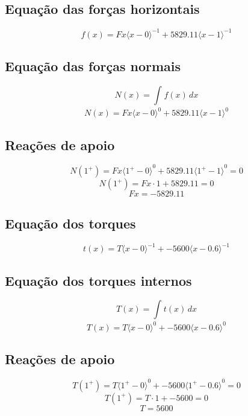 \documentclass[10pt]{article}
\begin{document}
\subsection*{Equação das forças horizontais}
\[{\scriptstyle f(x) = Fx{\langle x-0 \rangle}^{-1} + 5829.11{\langle x-1 \rangle}^{-1}
}\]\subsection*{Equação das forças normais}
\[{\scriptstyle N(x) = \int_{}^{} f(x) \,dx }\]\[{\scriptstyle N(x) = Fx{\langle x-0 \rangle}^{0} + 5829.11{\langle x-1 \rangle}^{0}
}\]\subsection*{Reações de apoio}
\[{\scriptstyle N(1^{+}) = Fx{\langle 1^{+}-0 \rangle}^{0} + 5829.11{\langle 1^{+}-1 \rangle}^{0}
 = 0}\]\[{\scriptstyle N(1^{+}) = Fx \cdot 1 + 5829.11  = 0}\]\[{\scriptstyle Fx = -5829.11 }\]
\subsection*{Equação dos torques}
\[{\scriptstyle t(x) = T{\langle x-0 \rangle}^{-1} + -5600{\langle x-0.6 \rangle}^{-1}
}\]\subsection*{Equação dos torques internos}
\[{\scriptstyle T(x) = \int_{}^{} t(x) \,dx }\]\[{\scriptstyle T(x) = T{\langle x-0 \rangle}^{0} + -5600{\langle x-0.6 \rangle}^{0}
}\]\subsection*{Reações de apoio}
\[{\scriptstyle T(1^{+}) = T{\langle 1^{+}-0 \rangle}^{0} + -5600{\langle 1^{+}-0.6 \rangle}^{0}
 = 0}\]\[{\scriptstyle T(1^{+}) = T \cdot 1 + -5600  = 0}\]\[{\scriptstyle T = 5600 }\]
\end{document}
